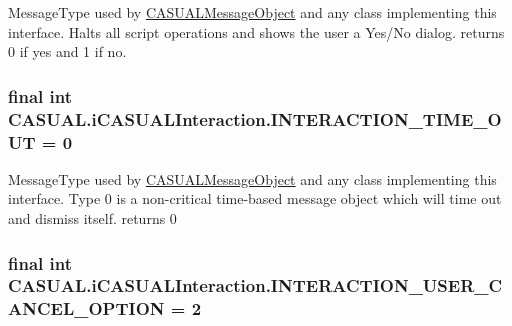 Message\-Type used by \hyperlink{classCASUAL_1_1CASUALMessageObject}{C\-A\-S\-U\-A\-L\-Message\-Object} and any class implementing this interface. Halts all script operations and shows the user a Yes/\-No dialog. returns 0 if yes and 1 if no. \hypertarget{interfaceCASUAL_1_1iCASUALInteraction_ad8a93fbf136514ec2abf7042846bf8d8}{
\subsubsection[{I\-N\-T\-E\-R\-A\-C\-T\-I\-O\-N\-\_\-\-T\-I\-M\-E\-\_\-\-O\-U\-T}]{\setlength{\rightskip}{0pt plus 5cm}final int C\-A\-S\-U\-A\-L.\-i\-C\-A\-S\-U\-A\-L\-Interaction.\-I\-N\-T\-E\-R\-A\-C\-T\-I\-O\-N\-\_\-\-T\-I\-M\-E\-\_\-\-O\-U\-T = 0}}\label{interfaceCASUAL_1_1iCASUALInteraction_ad8a93fbf136514ec2abf7042846bf8d8}
Message\-Type used by \hyperlink{classCASUAL_1_1CASUALMessageObject}{C\-A\-S\-U\-A\-L\-Message\-Object} and any class implementing this interface. Type 0 is a non-\/critical time-\/based message object which will time out and dismiss itself. returns 0 \hypertarget{interfaceCASUAL_1_1iCASUALInteraction_ab172a9affe078a64623627dc1ef6dcab}{
\subsubsection[{I\-N\-T\-E\-R\-A\-C\-T\-I\-O\-N\-\_\-\-U\-S\-E\-R\-\_\-\-C\-A\-N\-C\-E\-L\-\_\-\-O\-P\-T\-I\-O\-N}]{\setlength{\rightskip}{0pt plus 5cm}final int C\-A\-S\-U\-A\-L.\-i\-C\-A\-S\-U\-A\-L\-Interaction.\-I\-N\-T\-E\-R\-A\-C\-T\-I\-O\-N\-\_\-\-U\-S\-E\-R\-\_\-\-C\-A\-N\-C\-E\-L\-\_\-\-O\-P\-T\-I\-O\-N = 2}}\label{interfaceCASUAL_1_1iCASUALInteraction_ab172a9affe078a64623627dc1ef6dcab}
